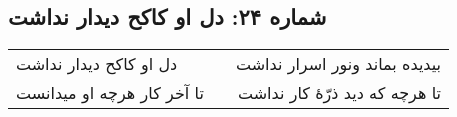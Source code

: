 \begin{center}
\section*{شماره ۲۴: دل او کاکح دیدار نداشت }
\label{sec:024}
\begin{longtable}{l p{0.5cm} r}
دل او کاکح دیدار نداشت 
&&
بیدیده بماند ونور اسرار نداشت
\\
تا آخر کار هرچه او میدانست
&&
تا هرچه که دید ذرّهٔ کار نداشت
\\
\end{longtable}
\end{center}
